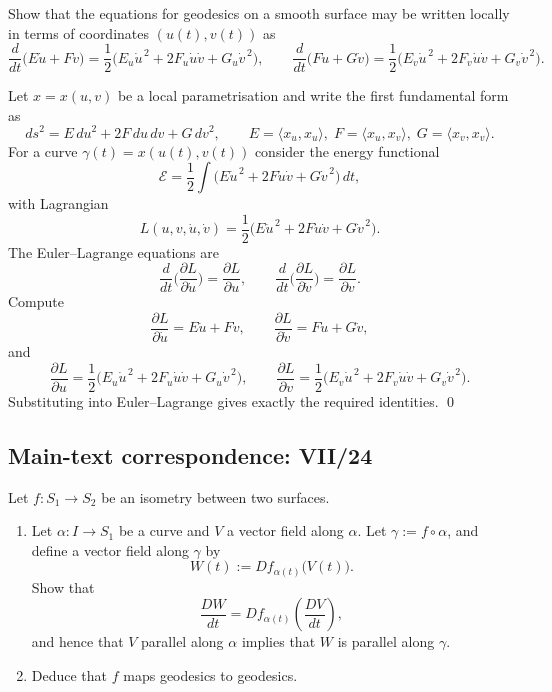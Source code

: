 \begin{problem}
\label{prob:cp-vii-0070}
Show that the equations for geodesics on a smooth surface may be written locally in terms of coordinates
	$(u(t),v(t))$ as
	\[
	\frac{d}{dt}\big(E\dot u + F\dot v\big)
	=\frac12\big(E_u\dot u^{\,2}+2F_u\dot u\dot v+G_u\dot v^{\,2}\big),
	\qquad
	\frac{d}{dt}\big(F\dot u + G\dot v\big)
	=\frac12\big(E_v\dot u^{\,2}+2F_v\dot u\dot v+G_v\dot v^{\,2}\big).
	\]
	
	\medskip
\end{problem}

\begin{solution}
Let $x=x(u,v)$ be a local parametrisation and write the first fundamental form as
	\[
	ds^2 = E\,du^2+2F\,du\,dv+G\,dv^2,
	\qquad
	E=\langle x_u,x_u\rangle,\;F=\langle x_u,x_v\rangle,\;G=\langle x_v,x_v\rangle.
	\]
	For a curve $\gamma(t)=x(u(t),v(t))$ consider the energy functional
	\[
	\mathcal E=\frac12\int \big(E\dot u^{\,2}+2F\dot u\dot v+G\dot v^{\,2}\big)\,dt,
	\]
	with Lagrangian
	\[
	L(u,v,\dot u,\dot v)=\frac12\big(E\dot u^{\,2}+2F\dot u\dot v+G\dot v^{\,2}\big).
	\]
	The Euler--Lagrange equations are
	\[
	\frac{d}{dt}\Big(\frac{\partial L}{\partial \dot u}\Big)=\frac{\partial L}{\partial u},
	\qquad
	\frac{d}{dt}\Big(\frac{\partial L}{\partial \dot v}\Big)=\frac{\partial L}{\partial v}.
	\]
	Compute
	\[
	\frac{\partial L}{\partial \dot u}=E\dot u+F\dot v,
	\qquad
	\frac{\partial L}{\partial \dot v}=F\dot u+G\dot v,
	\]
	and
	\[
	\frac{\partial L}{\partial u}
	=\frac12\big(E_u\dot u^{\,2}+2F_u\dot u\dot v+G_u\dot v^{\,2}\big),
	\qquad
	\frac{\partial L}{\partial v}
	=\frac12\big(E_v\dot u^{\,2}+2F_v\dot u\dot v+G_v\dot v^{\,2}\big).
	\]
	Substituting into Euler--Lagrange gives exactly the required identities.
	\qed
\end{solution}

\subsection*{Main-text correspondence: VII/24}

\begin{problem}
\label{prob:cp-vii-0071}
Let $f:S_1\to S_2$ be an isometry between two surfaces.
\begin{enumerate}
	\item
	Let $\alpha:I\to S_1$ be a curve and $V$ a vector field along $\alpha$.
	Let $\gamma:=f\circ \alpha$, and define a vector field along $\gamma$ by
	\[
	W(t):=D f_{\alpha(t)}\bigl(V(t)\bigr).
	\]
	Show that
	\[
	\frac{DW}{dt}=D f_{\alpha(t)}\!\left(\frac{DV}{dt}\right),
	\]
	and hence that $V$ parallel along $\alpha$ implies that $W$ is parallel along $\gamma$.
	
	\item
	Deduce that $f$ maps geodesics to geodesics.
\end{enumerate}
\end{problem}

